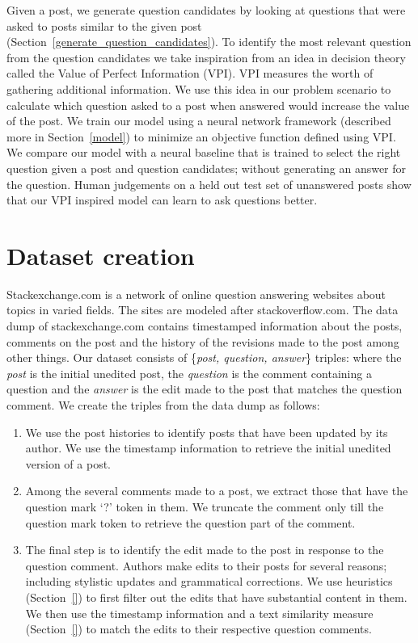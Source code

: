 \documentclass[11pt]{article}
\begin{document}
Given a post, we generate question candidates by looking at questions that were asked to posts similar to the given post (Section~\ref{generate_question_candidates}). To identify the most relevant question from the question candidates we take inspiration from an idea in decision theory called the Value of Perfect Information (VPI). VPI measures the worth of gathering additional information. We use this idea in our problem scenario to calculate which question asked to a post when answered would increase the value of the post. We train our model using a neural network framework (described more in Section~\ref{model}) to minimize an objective function defined using VPI. We compare our model with a neural baseline that is trained to select the right question given a post and question candidates; without generating an answer for the question. Human judgements on a held out test set of unanswered posts show that our VPI inspired model can learn to ask questions better.

\section{Dataset creation}\label{dataset}

Stackexchange.com is a network of online question answering websites about topics in varied fields. The sites are modeled after stackoverflow.com. The data dump of stackexchange.com contains timestamped information about the posts, comments on the post and the history of the revisions made to the post among other things. Our dataset consists of \{\textit{post, question, answer}\} triples: where the \textit{post} is the initial unedited post, the \textit{question} is the comment containing a question and the \textit{answer} is the edit made to the post that matches the question comment. We create the triples from the data dump as follows:
\begin{enumerate}
\item We use the post histories to identify posts that have been updated by its author. We use the timestamp information to retrieve the initial unedited version of a post.
\item Among the several comments made to a post, we extract those that have the question mark `?' token in them. We truncate the comment only till the question mark token to retrieve the question part of the comment.  
\item The final step is to identify the edit made to the post in response to the question comment. Authors make edits to their posts for several reasons; including stylistic updates and grammatical corrections. We use heuristics (Section~\ref{}) to first filter out the edits that have substantial content in them. We then use the timestamp information and a text similarity measure (Section~\ref{}) to match the edits to their respective question comments.
\end{enumerate}
\end{document}
